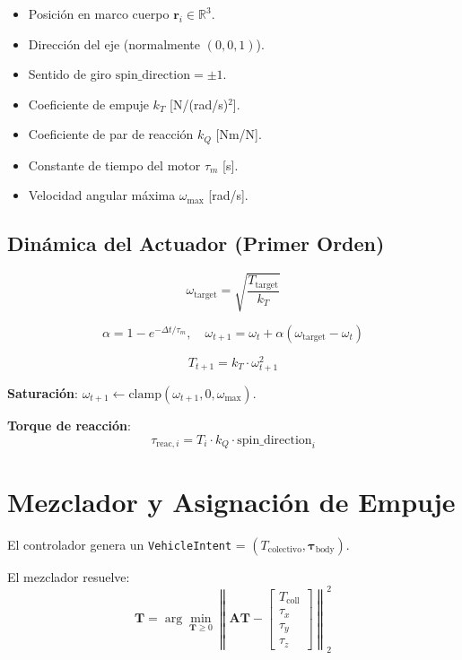 \documentclass[12pt,a4paper]{article}
\begin{document}
\begin{itemize}
    \item Posición en marco cuerpo $\mathbf{r}_i \in \mathbb{R}^3$.
    \item Dirección del eje (normalmente $(0,0,1)$).
    \item Sentido de giro $\text{spin\_direction} = \pm 1$.
    \item Coeficiente de empuje $k_T$ [N/(rad/s)$^2$].
    \item Coeficiente de par de reacción $k_Q$ [Nm/N].
    \item Constante de tiempo del motor $\tau_m$ [s].
    \item Velocidad angular máxima $\omega_{\max}$ [rad/s].
\end{itemize}

\subsection{Dinámica del Actuador (Primer Orden)}

\begin{equation}
    \omega_{\text{target}} = \sqrt{\frac{T_{\text{target}}}{k_T}}
\end{equation}

\begin{equation}
    \alpha = 1 - e^{-\Delta t / \tau_m}, \quad
    \omega_{t+1} = \omega_t + \alpha (\omega_{\text{target}} - \omega_t)
\end{equation}

\begin{equation}
    T_{t+1} = k_T \cdot \omega_{t+1}^2
\end{equation}

\textbf{Saturación}: $\omega_{t+1} \leftarrow \text{clamp}(\omega_{t+1}, 0, \omega_{\max})$.

\textbf{Torque de reacción}:
\begin{equation}
    \tau_{\text{reac},i} = T_i \cdot k_Q \cdot \text{spin\_direction}_i
\end{equation}

\section{Mezclador y Asignación de Empuje}

El controlador genera un \texttt{VehicleIntent} = $(T_{\text{colectivo}}, \boldsymbol{\tau}_{\text{body}})$.

El mezclador resuelve:
\begin{equation}
    \mathbf{T} = \arg\min_{\mathbf{T} \geq 0} \left\| \mathbf{A} \mathbf{T} - \begin{bmatrix} T_{\text{coll}} \\ \tau_x \\ \tau_y \\ \tau_z \end{bmatrix} \right\|^2_2
\end{equation}
\end{document}

